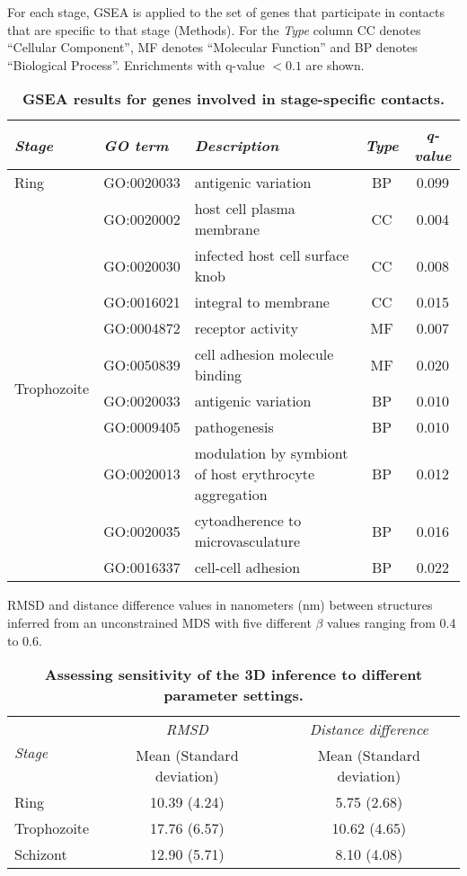 \documentclass{article}
\begin{document}
\begin{table}[ht!]
\caption{{\bf GSEA results for genes involved in stage-specific contacts.}}
{\normalsize For each stage, GSEA is applied to the set of genes that participate
in contacts that are specific to that stage (Methods). For the \emph{Type} column CC
denotes ``Cellular Component'', MF denotes ``Molecular Function'' and BP denotes
``Biological Process''. Enrichments with q-value $< 0.1$ are shown. }
\vspace{10pt}
\begin{center}
\begin{tabular}{lllcc}
\hline
\emph{Stage} & \emph{GO term }&  \emph{Description} & \emph{Type} & \emph{q-value}  \\
\hline
\multirow{1}{*}{Ring}
& GO:0020033 & antigenic variation & BP & 0.099\\
\hline
\multirow{10}{*}{Trophozoite}
& GO:0020002 & host cell plasma membrane & CC & 0.004\\
& GO:0020030 & infected host cell surface knob & CC & 0.008\\
& GO:0016021 & integral to membrane & CC & 0.015\\
& GO:0004872 & receptor activity & MF & 0.007\\
& GO:0050839 & cell adhesion molecule binding & MF & 0.020\\
& GO:0020033 & antigenic variation & BP  & 0.010\\
& GO:0009405 & pathogenesis & BP & 0.010\\
& GO:0020013 & modulation by symbiont of host erythrocyte aggregation & BP & 0.012\\
& GO:0020035 & cytoadherence to microvasculature & BP & 0.016\\
& GO:0016337 & cell-cell adhesion & BP & 0.022\\
\hline
\end{tabular}
\end{center}
\label{table:GSEAcompareStages}
\end{table}
\clearpage


\begin{table}[ht!]
\caption{{\bf Assessing sensitivity of the 3D inference to different parameter settings.}}
{RMSD and distance difference values in nanometers (nm) between structures inferred from
an unconstrained MDS with five different $\beta$ values ranging from 0.4 to 0.6.}
\vspace{15pt}
\begin{center}
\begin{tabular}{lcc}
\hline
\multirow{2}{*}{\emph{Stage}} & \emph{RMSD} & \emph{Distance difference} \\
& Mean (Standard deviation) & Mean (Standard deviation) \\
\hline
Ring & 10.39 {(4.24)} & 5.75 {(2.68)} \\
Trophozoite & 17.76 {(6.57)} & 10.62 {(4.65)} \\
Schizont & 12.90 {(5.71)} & 8.10 {(4.08)} \\
\hline
\end{tabular}
\end{center}
\label{table:stabilityToBeta}
\end{table}
\clearpage
\end{document}

